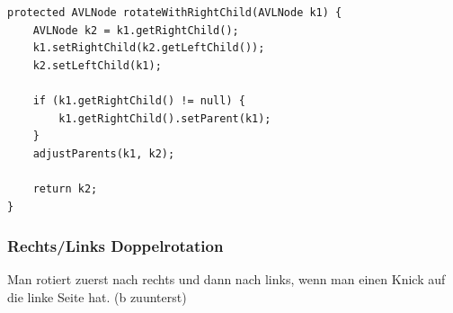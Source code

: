 \begin{lstlisting}[caption=AVL Tree: Single left rotation]
protected AVLNode rotateWithRightChild(AVLNode k1) {
	AVLNode k2 = k1.getRightChild();
	k1.setRightChild(k2.getLeftChild());
	k2.setLeftChild(k1);

	if (k1.getRightChild() != null) {
		k1.getRightChild().setParent(k1);
	}
	adjustParents(k1, k2);
	
	return k2;
}
\end{lstlisting}

\clearpage

\subsubsection{Rechts/Links Doppelrotation}
Man rotiert zuerst nach rechts und dann nach links, wenn man einen Knick auf die linke Seite hat. (b zuunterst)
